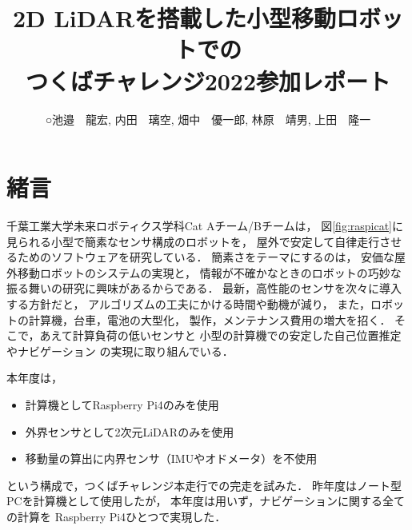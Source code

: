 \documentclass[twocolumn,9pt]{jsproceedings}
\title{2D LiDARを搭載した小型移動ロボットでの\\つくばチャレンジ2022参加レポート}
\author{○池邉　龍宏\authorrefmark{1}, 内田　璃空\authorrefmark{1}, 畑中　優一郎\authorrefmark{1}, 林原　靖男\authorrefmark{1}, 上田　隆一\authorrefmark{1}}
\affiliation{千葉工業大学 未来ロボティクス学科 Cat Aチーム}
\begin{document}
\maketitle



\section{緒言}

千葉工業大学未来ロボティクス学科Cat Aチーム/Bチームは，
図\ref{fig:raspicat}に見られる小型で簡素なセンサ構成のロボットを，
屋外で安定して自律走行させるためのソフトウェアを研究している．
簡素さをテーマにするのは，
安価な屋外移動ロボットのシステムの実現と，
情報が不確かなときのロボットの巧妙な振る舞いの研究に興味があるからである．
最新，高性能のセンサを次々に導入する方針だと，
アルゴリズムの工夫にかける時間や動機が減り，
また，ロボットの計算機，台車，電池の大型化，
製作，メンテナンス費用の増大を招く．
そこで，あえて計算負荷の低いセンサと
小型の計算機での安定した自己位置推定やナビゲーション
の実現に取り組んでいる．


本年度は，
\begin{itemize}
\item 計算機としてRaspberry Pi4のみを使用
\item 外界センサとして2次元LiDARのみを使用
\item 移動量の算出に内界センサ（IMUやオドメータ）を不使用
\end{itemize}
という構成で，つくばチャレンジ本走行での完走を試みた．
昨年度はノート型PCを計算機として使用したが，
本年度は用いず，ナビゲーションに関する全ての計算を
Raspberry Pi4ひとつで実現した．
\end{document}
